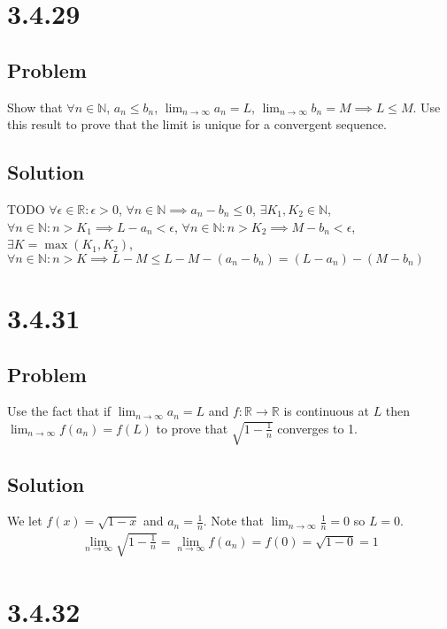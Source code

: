 \documentclass[12pt]{article}
\newcommand{\R}    [0]{\mathbb{R}                   }
\newcommand{\N}    [0]{\mathbb{N}                   }
\begin{document}
\section*{3.4.29}

\subsection*{Problem}
Show that $\forall n \in \N$, $a_n \leq b_n$, $\lim_{n \to \infty} a_n = L$, $\lim_{n \to \infty} b_n = M \implies L \leq M$. Use this result to prove that the limit is unique for a convergent sequence.

\subsection*{Solution}
TODO
$\forall \epsilon \in \R : \epsilon > 0$, $\forall n \in \N \implies a_n - b_n \leq 0$, $\exists K_1, K_2 \in \N$, $\forall n \in \N : n > K_1 \implies L - a_n < \epsilon$, $\forall n \in \N : n > K_2 \implies M - b_n < \epsilon$, $\exists K = \max(K_1, K_2)$, $\forall n \in \N : n > K \implies L - M \leq L - M - (a_n - b_n) = (L - a_n) - (M - b_n)$



\section*{3.4.31}

\subsection*{Problem}
Use the fact that if $\lim_{n \to \infty} a_n = L$ and $f : \R \to \R$ is continuous at $L$ then $\lim_{n \to \infty} f(a_n) = f(L)$ to prove that $\sqrt{1 - \frac{1}{n}}$ converges to 1.

\subsection*{Solution}
We let $f(x) = \sqrt{1-x}$ and $a_n = \frac{1}{n}$. Note that $\lim_{n\to\infty} \frac{1}{n} = 0$ so $L = 0$.
\begin{align*}
    \lim_{n\to\infty} \sqrt{1 - \frac{1}{n}} = \lim_{n\to\infty} f(a_n) = f(0) = \sqrt{1 - 0} = 1
\end{align*}



\section*{3.4.32}
\end{document}

